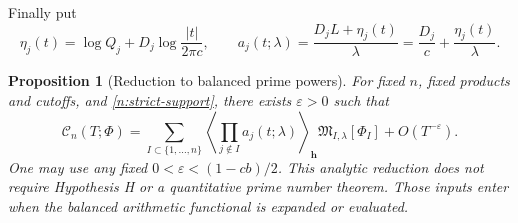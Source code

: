 \documentclass[11pt]{article}
\numberwithin{equation}{section}
\newtheorem{proposition}[theorem]{Proposition}
\theoremstyle{remark}
\begin{document}
Finally put
\begin{equation}\label{n:singleton-density}
 \eta_j(t)=\log Q_j+D_j\log\frac{|t|}{2\pi c},\qquad
 a_j(t;\lambda)=\frac{D_jL+\eta_j(t)}{\lambda}
              =\frac{D_j}{c}+\frac{\eta_j(t)}{\lambda}.
\end{equation}

\begin{proposition}[Reduction to balanced prime powers]
\label{n:reduction-theorem}
For fixed $n$, fixed products and cutoffs, and
\eqref{n:strict-support}, there exists $\varepsilon>0$ such that
\begin{equation}\label{n:reduction-formula}
 \mathcal C_n(T;\Phi)=
 \sum_{I\subset\{1,\ldots,n\}}
 \left\langle\prod_{j\notin I}a_j(t;\lambda)
 \right\rangle_{\boldsymbol h}
 \mathfrak M_{I,\lambda}[\Phi_I]
 +O(T^{-\varepsilon}).
\end{equation}
One may use any fixed $0<\varepsilon<(1-cb)/2$. This analytic
reduction does not require Hypothesis H or a quantitative prime number
theorem. Those inputs enter when the balanced arithmetic functional is
expanded or evaluated.
\end{proposition}
\end{document}
